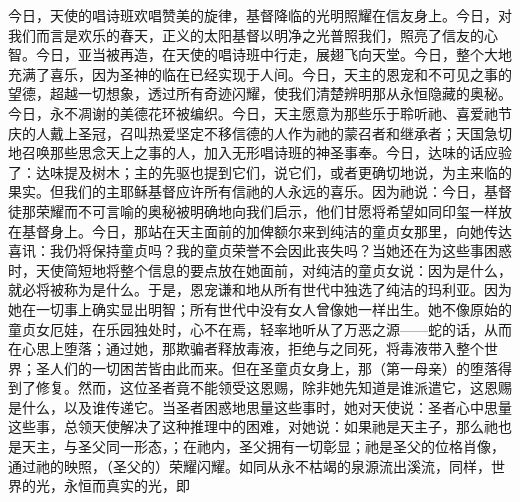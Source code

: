 今日，天使的唱诗班欢唱赞美的旋律，基督降临的光明照耀在信友身上。今日，对我们而言是欢乐的春天，正义的太阳基督以明净之光普照我们，照亮了信友的心智。今日，亚当被再造，在天使的唱诗班中行走，展翅飞向天堂。今日，整个大地充满了喜乐，因为圣神的临在已经实现于人间。今日，天主的恩宠和不可见之事的望德，超越一切想象，透过所有奇迹闪耀，使我们清楚辨明那从永恒隐藏的奥秘。今日，永不凋谢的美德花环被编织。今日，天主愿意为那些乐于聆听祂、喜爱祂节庆的人戴上圣冠，召叫热爱坚定不移信德的人作为祂的蒙召者和继承者；天国急切地召唤那些思念天上之事的人，加入无形唱诗班的神圣事奉。今日，达味的话应验了：达味提及树木；主的先驱也提到它们，说它们，或者更确切地说，为主来临的果实。但我们的主耶稣基督应许所有信祂的人永远的喜乐。因为祂说：今日，基督徒那荣耀而不可言喻的奥秘被明确地向我们启示，他们甘愿将希望如同印玺一样放在基督身上。今日，那站在天主面前的加俾额尔来到纯洁的童贞女那里，向她传达喜讯：我仍将保持童贞吗？我的童贞荣誉不会因此丧失吗？当她还在为这些事困惑时，天使简短地将整个信息的要点放在她面前，对纯洁的童贞女说：因为是什么，就必将被称为是什么。于是，恩宠谦和地从所有世代中独选了纯洁的玛利亚。因为她在一切事上确实显出明智；所有世代中没有女人曾像她一样出生。她不像原始的童贞女厄娃，在乐园独处时，心不在焉，轻率地听从了万恶之源——蛇的话，从而在心思上堕落；通过她，那欺骗者释放毒液，拒绝与之同死，将毒液带入整个世界；圣人们的一切困苦皆由此而来。但在圣童贞女身上，那（第一母亲）的堕落得到了修复。然而，这位圣者竟不能领受这恩赐，除非她先知道是谁派遣它，这恩赐是什么，以及谁传递它。当圣者困惑地思量这些事时，她对天使说：圣者心中思量这些事，总领天使解决了这种推理中的困难，对她说：如果祂是天主子，那么祂也是天主，与圣父同一形态，；在祂内，圣父拥有一切彰显；祂是圣父的位格肖像，通过祂的映照，（圣父的）荣耀闪耀。如同从永不枯竭的泉源流出溪流，同样，世界的光，永恒而真实的光，即